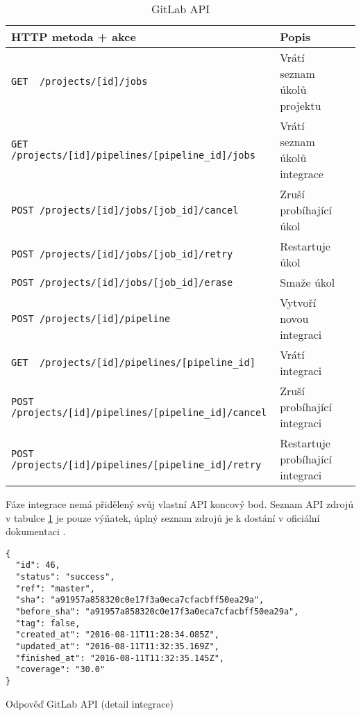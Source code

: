 \begin{table}[ht]
\centering
\fontsize{9.5}{11.5}\selectfont
\caption{GitLab API}
\label{table:gitlab-api}
\begin{tabular}{|l|l|l|}
\hline
HTTP metoda + akce                                          & Popis \\ \hline
\verb|GET  /projects/[id]/jobs|                             & Vrátí seznam úkolů projektu      \\ \hline
\verb|GET  /projects/[id]/pipelines/[pipeline_id]/jobs|     & Vrátí seznam úkolů integrace      \\ \hline
\verb|POST /projects/[id]/jobs/[job_id]/cancel|             & Zruší probíhající úkol      \\ \hline
\verb|POST /projects/[id]/jobs/[job_id]/retry|              & Restartuje úkol      \\ \hline
\verb|POST /projects/[id]/jobs/[job_id]/erase|              & Smaže úkol      \\ \hline
\verb|POST /projects/[id]/pipeline|                         & Vytvoří novou integraci      \\ \hline
\verb|GET  /projects/[id]/pipelines/[pipeline_id]|          & Vrátí integraci      \\ \hline
\verb|POST /projects/[id]/pipelines/[pipeline_id]/cancel|   & Zruší probíhající integraci      \\ \hline
\verb|POST /projects/[id]/pipelines/[pipeline_id]/retry|    & Restartuje probíhající integraci      \\ \hline
\end{tabular}
\end{table}

Fáze integrace nemá přidělený svůj vlastní API koncový bod.
Seznam API zdrojů v tabulce \ref{table:gitlab-api} je pouze výňatek, úplný seznam zdrojů je k dostání v oficiální dokumentaci \cite{gitlab_api}. 

\begin{listing}[ht]
\begin{verbatim}
{
  "id": 46,
  "status": "success",
  "ref": "master",
  "sha": "a91957a858320c0e17f3a0eca7cfacbff50ea29a",
  "before_sha": "a91957a858320c0e17f3a0eca7cfacbff50ea29a",
  "tag": false,
  "created_at": "2016-08-11T11:28:34.085Z",
  "updated_at": "2016-08-11T11:32:35.169Z",
  "finished_at": "2016-08-11T11:32:35.145Z",
  "coverage": "30.0"
}
\end{verbatim}
\label{code:gitlab-api}
\caption{Odpověď GitLab API (detail integrace)}
\end{listing}

